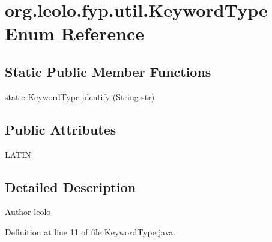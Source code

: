 \hypertarget{enumorg_1_1leolo_1_1fyp_1_1util_1_1_keyword_type}{\section{org.\-leolo.\-fyp.\-util.\-Keyword\-Type Enum Reference}
\label{enumorg_1_1leolo_1_1fyp_1_1util_1_1_keyword_type}
}
\subsection*{Static Public Member Functions}
\begin{DoxyCompactItemize}
\item 
static \hyperlink{enumorg_1_1leolo_1_1fyp_1_1util_1_1_keyword_type}{Keyword\-Type} \hyperlink{enumorg_1_1leolo_1_1fyp_1_1util_1_1_keyword_type_ac1acfb372074f50305f2295f9ae20071}{identify} (String str)
\end{DoxyCompactItemize}
\subsection*{Public Attributes}
\begin{DoxyCompactItemize}
\item 
\hyperlink{enumorg_1_1leolo_1_1fyp_1_1util_1_1_keyword_type_a3d95aac3eb329bd4dbd98066c5c2bc68}{L\-A\-T\-I\-N}
\end{DoxyCompactItemize}


\subsection{Detailed Description}
\begin{DoxyAuthor}{Author}
leolo 
\end{DoxyAuthor}


Definition at line 11 of file Keyword\-Type.\-java.



